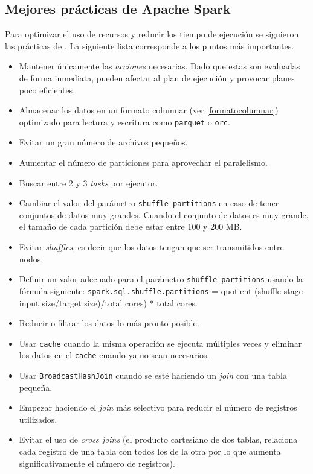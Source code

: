 \subsection{Mejores prácticas de Apache Spark}

Para optimizar el uso de recursos y reducir los tiempo de ejecución se siguieron las prácticas de \cite{sparkibm}. La siguiente lista corresponde a los puntos más importantes.

\begin{itemize}
	\item Mantener únicamente las \textit{acciones} necesarias. Dado que estas son evaluadas de forma inmediata, pueden afectar al plan de ejecución y provocar planes poco eficientes.
	\item Almacenar los datos en un formato columnar (ver \ref{formatocolumnar}) optimizado para lectura y escritura como \texttt{parquet} o \texttt{orc}.
	\item Evitar un gran número de archivos pequeños.
	\item Aumentar el número de particiones para aprovechar el paralelismo.
	\item Buscar entre 2 y 3 \textit{tasks} por ejecutor.
	\item Cambiar el valor del parámetro \texttt{shuffle partitions} en caso de tener conjuntos de datos muy grandes. Cuando el conjunto de datos es muy grande, el tamaño de cada partición debe estar entre 100 y 200 MB. 
	\item Evitar \textit{shuffles}, es decir que los datos tengan que ser transmitidos entre nodos.
	\item Definir un valor adecuado para el parámetro \texttt{shuffle partitions} usando la fórmula siguiente: \texttt{spark.sql.shuffle.partitions} = quotient (shuffle stage input size/target size)/total cores) * total cores.
	\item Reducir o filtrar los datos lo más pronto posible.
	\item Usar \texttt{cache} cuando la misma operación se ejecuta múltiples veces y eliminar los datos en el \texttt{cache} cuando ya no sean necesarios.
	\item Usar \texttt{BroadcastHashJoin} cuando se esté haciendo un \textit{join} con una tabla pequeña.
	\item Empezar haciendo el \textit{join} más selectivo para reducir el número de registros utilizados.
	\item Evitar el uso de \textit{cross joins} (el producto cartesiano de dos tablas, relaciona cada registro de una tabla con todos los de la otra por lo que aumenta significativamente el número de registros).

\end{itemize}
